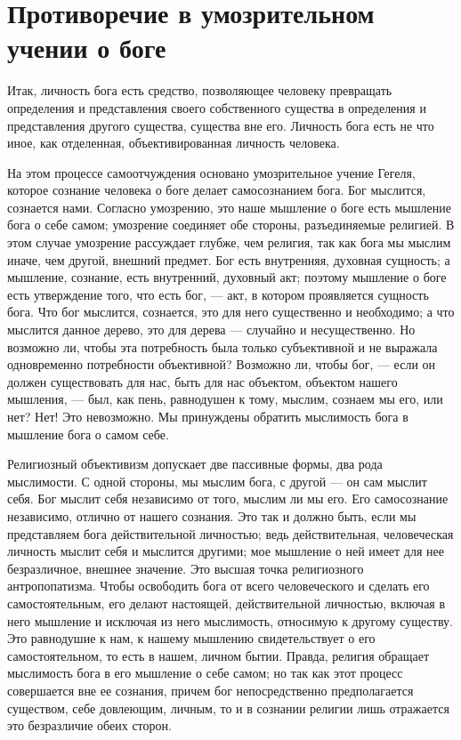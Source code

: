\documentclass[12pt,oneside]{book}
\begin{document}
\chapter{Противоречие в умозрительном учении о боге}


Итак, личность бога есть средство, позволяющее человеку превращать определения и представления своего собственного существа в определения и представления другого существа, существа вне его. Личность бога есть не что иное, как отделенная, объективированная личность человека.

На этом процессе самоотчуждения основано умозрительное учение Гегеля, которое сознание человека о боге делает самосознанием бога. Бог мыслится, сознается нами. Согласно умозрению, это наше мышление о боге есть мышление бога о себе самом; умозрение соединяет обе стороны, разъединяемые религией. В этом случае умозрение рассуждает глубже, чем религия, так как бога мы мыслим иначе, чем другой, внешний предмет. Бог есть внутренняя, духовная сущность; а мышление, сознание, есть внутренний, духовный акт; поэтому мышление о боге есть утверждение того, что есть бог, --- акт, в котором проявляется сущность бога. Что бог мыслится, сознается, это для него существенно и необходимо; а что мыслится данное дерево, это для дерева --- случайно и несущественно. Но возможно ли, чтобы эта потребность была только субъективной и не выражала одновременно потребности объективной? Возможно ли, чтобы бог, --- если он должен существовать для нас, быть для нас объектом, объектом нашего мышления, --- был, как пень, равнодушен к тому, мыслим, сознаем мы его, или нет? Нет! Это невозможно. Мы принуждены обратить мыслимость бога в мышление бога о самом себе.

Религиозный объективизм допускает две пассивные формы, два рода мыслимости. С одной стороны, мы мыслим бога, с другой --- он сам мыслит себя. Бог мыслит себя независимо от того, мыслим ли мы его. Его самосознание независимо, отлично от нашего сознания. Это так и должно быть, если мы представляем бога действительной личностью; ведь действительная, человеческая личность мыслит себя и мыслится другими; мое мышление о ней имеет для нее безразличное, внешнее значение. Это высшая точка религиозного антропопатизма. Чтобы освободить бога от всего человеческого и сделать его самостоятельным, его делают настоящей, действительной личностью, включая в него мышление и исключая из него мыслимость, относимую к другому существу. Это равнодушие к нам, к нашему мышлению свидетельствует о его самостоятельном, то есть в нашем, личном бытии. Правда, религия обращает мыслимость бога в его мышление о себе самом; но так как этот процесс совершается вне ее сознания, причем бог непосредственно предполагается существом, себе довлеющим, личным, то и в сознании религии лишь отражается это безразличие обеих сторон.
\end{document}
